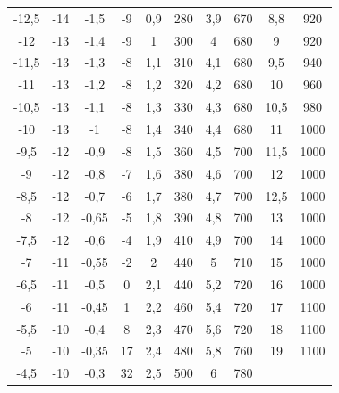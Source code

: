 \begin{table}[H]
\begin{tabular}{S[table-format=2.1] S[table-format=2] S[table-format=1.2] S[table-format=2]S[table-format=1.2]S[table-format=3]S[table-format=1.1]S[table-format=3]S[table-format=2.1]S[table-format=4]}
      -12,5 & -14 & -1,5 & -9 & 0,9 & 280 & 3,9 & 670 & 8,8 & 920 \\
      -12 & -13 & -1,4 & -9 & 1 & 300 & 4 & 680 & 9 & 920 \\
      -11,5 & -13 & -1,3 & -8 & 1,1 & 310 & 4,1 & 680 & 9,5 & 940 \\
      -11 & -13 & -1,2 & -8 & 1,2 & 320 & 4,2 & 680 & 10 & 960 \\
      -10,5 & -13 & -1,1 & -8 & 1,3 & 330 & 4,3 & 680 & 10,5 & 980 \\
      -10 & -13 & -1 & -8 & 1,4 & 340 & 4,4 & 680 & 11 & 1000 \\
      -9,5 & -12 & -0,9 & -8 & 1,5 & 360 & 4,5 & 700 & 11,5 & 1000 \\
      -9 & -12 & -0,8 & -7 & 1,6 & 380 & 4,6 & 700 & 12 & 1000 \\
      -8,5 & -12 & -0,7 & -6 & 1,7 & 380 & 4,7 & 700 & 12,5 & 1000 \\
      -8 & -12 & -0,65 & -5 & 1,8 & 390 & 4,8 & 700 & 13 & 1000 \\
      -7,5 & -12 & -0,6 & -4 & 1,9 & 410 & 4,9 & 700 & 14 & 1000 \\
      -7 & -11 & -0,55 & -2 & 2 & 440 & 5 & 710 & 15 & 1000 \\
      -6,5 & -11 & -0,5 & 0 & 2,1 & 440 & 5,2 & 720 & 16 & 1000 \\
      -6 & -11 & -0,45 & 1 & 2,2 & 460 & 5,4 & 720 & 17 & 1100 \\
      -5,5 & -10 & -0,4 & 8 & 2,3 & 470 & 5,6 & 720 & 18 & 1100 \\
      -5 & -10 & -0,35 & 17 & 2,4 & 480 & 5,8 & 760 & 19 & 1100 \\
      -4,5 & -10 & -0,3 & 32 & 2,5 & 500 & 6 & 780 &  &  \\
      \bottomrule
  \end{tabular}
\end{table}

